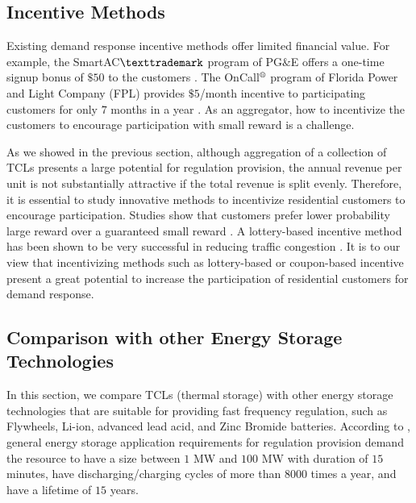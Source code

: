 \documentclass[onecolumn,journal]{IEEEtran}
\begin{document}
\subsection{Incentive Methods}
Existing demand response incentive methods offer limited financial value. For example, the SmartAC$\texttrademark$ program of PG$\&$E offers a one-time signup bonus of $\$50$ to the customers \cite{SmartAC}.  The OnCall$^\text{\textregistered}$ program of Florida Power and Light Company (FPL) provides $\$5$/month incentive to participating customers for only $7$ months in a year  \cite{OnCall}. As an aggregator, how to incentivize the customers to encourage participation with small reward is a challenge. 

As we showed in the previous section, although aggregation of a collection of \acp{TCL} presents a large potential for regulation provision, the annual revenue  per unit is not substantially attractive if the total revenue is split evenly. Therefore, it is essential to study innovative methods to incentivize residential customers to encourage participation. Studies show that customers prefer lower probability large reward over a guaranteed small reward \cite{kahneman1979prospect}. A lottery-based incentive method has been shown to be very successful in reducing traffic congestion \cite{merugu2009incentive}. It is to our view that incentivizing methods such as lottery-based \cite{merugu2009incentive} or coupon-based  \cite{zhong2013coupon} incentive present a great potential to increase the participation of residential customers for demand response.


\subsection{Comparison with other Energy Storage Technologies}\label{sec:comparison}
In this section, we compare TCLs (thermal storage) with other energy storage technologies that are suitable for providing fast frequency regulation, such as Flywheels, Li-ion, advanced lead acid,  and Zinc Bromide batteries.  According to \cite{rastler2010electricity}, general energy storage application requirements for regulation provision demand the resource to have a size between $1$ MW and $100$ MW with duration of $15$ minutes, have  discharging/charging cycles of more than $8000$ times a year, and have a lifetime of $15$ years. 
\end{document}
